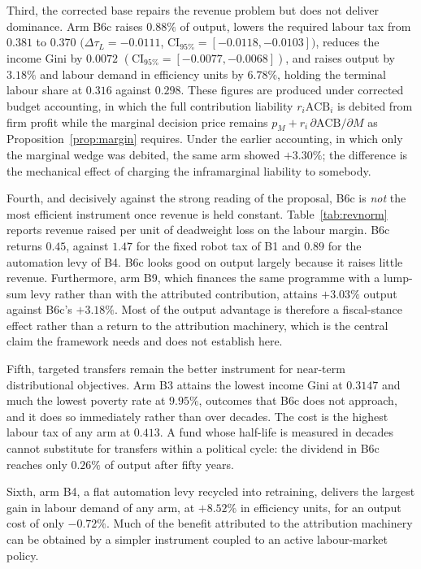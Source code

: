 \documentclass[journal]{IEEEtran}
\theoremstyle{plain}
\theoremstyle{definition}
\newcommand{\ACB}{\mathrm{ACB}}
\begin{document}
Third, the corrected base repairs the revenue problem but does not deliver
dominance. Arm B6c raises $0.88\%$ of output, lowers the required labour tax
from $0.381$ to $0.370$ $(\Delta\tau_L = -0.0111$, $\mathrm{CI}_{95\%} =
[-0.0118,-0.0103])$, reduces the income Gini by $0.0072$ $(\mathrm{CI}_{95\%} =
[-0.0077,-0.0068])$, and raises output by $3.18\%$ and labour demand in
efficiency units by $6.78\%$, holding the terminal labour share at $0.316$
against $0.298$. These figures are produced under corrected budget accounting,
in which the full contribution liability $r_i\ACB_i$ is debited from firm
profit while the marginal decision price remains $p_M + r_i\,\partial\ACB/
\partial M$ as Proposition~\ref{prop:margin} requires. Under the earlier
accounting, in which only the marginal wedge was debited, the same arm showed
$+3.30\%$; the difference is the mechanical effect of charging the
inframarginal liability to somebody.

Fourth, and decisively against the strong reading of the proposal, B6c is
\emph{not} the most efficient instrument once revenue is held constant.
Table~\ref{tab:revnorm} reports revenue raised per unit of deadweight loss on
the labour margin. B6c returns $0.45$, against $1.47$ for the fixed robot tax
of B1 and $0.89$ for the automation levy of B4. B6c looks good on output
largely because it raises little revenue. Furthermore, arm B9, which finances
the same programme with a lump-sum levy rather than with the attributed
contribution, attains $+3.03\%$ output against B6c's $+3.18\%$. Most of the
output advantage is therefore a fiscal-stance effect rather than a return to
the attribution machinery, which is the central claim the framework needs and
does not establish here.

Fifth, targeted transfers remain the better instrument for near-term
distributional objectives. Arm B3 attains the lowest income Gini at $0.3147$ and
much the lowest poverty rate at $9.95\%$, outcomes that B6c does not approach,
and it does so immediately rather than over decades. The cost is the highest
labour tax of any arm at $0.413$. A fund whose half-life is measured in decades
cannot substitute for transfers within a political cycle: the dividend in B6c
reaches only $0.26\%$ of output after fifty years.

Sixth, arm B4, a flat automation levy recycled into retraining, delivers the
largest gain in labour demand of any arm, at $+8.52\%$ in efficiency units, for
an output cost of only $-0.72\%$. Much of the benefit attributed to the
attribution machinery can be obtained by a simpler instrument coupled to an
active labour-market policy.
\end{document}
